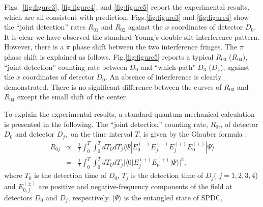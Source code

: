 \documentclass[pra,aps,epsf,12pt]{revtex4-2}
\begin{document}
Figs.~\ref{fig:figure3}, \ref{fig:figure4}, and \ref{fig:figure5} report the experimental
results, which are all consistent with prediction. Figs.\ref{fig:figure3} and
\ref{fig:figure4} show the ``joint detection'' rates $R_{01}$ and $R_{02}$ against the
$x$ coordinates of detector $D_{0}$. It is clear we have observed the standard Young's
double-slit interference pattern. However, there is a $\pi $ phase shift between the two
interference fringes. The $\pi$ phase shift
is explained as follows. Fig.\ref{fig:figure5} reports a typical $%
R_{03}$ ($R_{04}$), ``joint detection'' counting rate between $D_{0}$ and ``which-path" $%
D_{3}$ ($D_{4}$), against the $x$ coordinates of detector $D_{0}$. An absence of
interference is clearly demonstrated. There is no significant difference between the
curves of $R_{03}$ and $R_{04}$ except the small shift of the center.

To explain the experimental results, a standard quantum mechanical calculation is
presented in the following. The ``joint detection'' counting rate, $R_{0i}$, of detector
$D_{0}$ and detector $D_{j},$ on the time interval $T$, is given by the Glauber formula
\cite{Glauber}:
\begin{eqnarray}
R_{0j}&\propto& \frac{1}{T}\int_{0}^{T}\int_{0}^{T}dT_{0}dT_{j}\langle \Psi |
E_{0}^{(-)}E_{j}^{(-)}E_{j}^{(+)}E_{0}^{(+)}| \Psi \rangle \nonumber \\
&=&\frac{1}{T}\int_{0}^{T}\int_{0}^{T}dT_{0}dT_{j}| \langle 0| E_{j}^{(+)}E_{0}^{(+)}|
\Psi \rangle | ^{2} , \label{coin}
\end{eqnarray}
where $T_{0}$ is the detection time of $D_{0}$, $T_{j}$ is the detection time of $D_{j}($
$j=1,2,3,4$) and $E_{0,j}^{(\pm )}$ are positive and negative-frequency components of the
field at detectors $D_{0}$ and $D_{j}$, respectively. $| \Psi \rangle$ is the entangled
state of SPDC,
\end{document}
